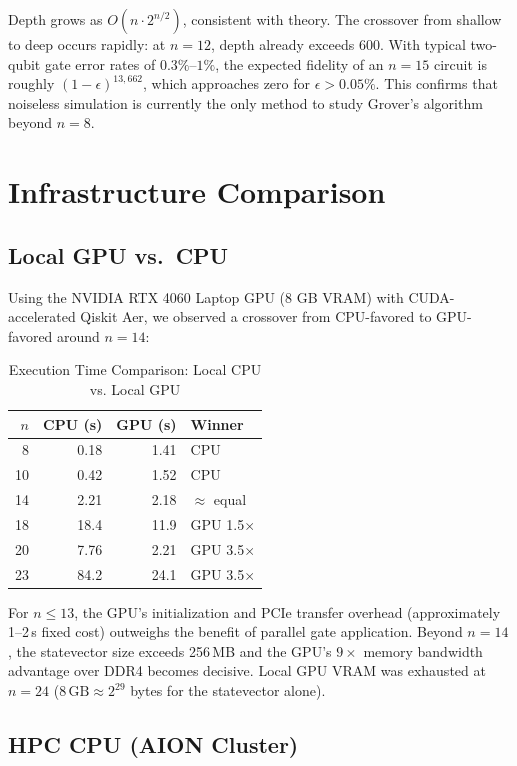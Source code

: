 \documentclass[sigconf, authorversion, nonacm]{acmart}
\begin{document}
Depth grows as $O(n \cdot 2^{n/2})$, consistent with theory. The crossover from shallow to deep occurs rapidly: at $n=12$, depth already exceeds 600. With typical two-qubit gate error rates of $0.3\%$--$1\%$, the expected fidelity of an $n=15$ circuit is roughly $(1-\epsilon)^{13{,}662}$, which approaches zero for $\epsilon > 0.05\%$. This confirms that noiseless simulation is currently the only method to study Grover's algorithm beyond $n=8$.

\section{Infrastructure Comparison}

\subsection{Local GPU vs.\ CPU}

Using the NVIDIA RTX 4060 Laptop GPU (8 GB VRAM) with CUDA-accelerated Qiskit Aer, we observed a crossover from CPU-favored to GPU-favored around $n=14$:

\begin{table}[htbp]
\centering
\caption{Execution Time Comparison: Local CPU vs. Local GPU}
\label{tab:local_gpu_cpu}
\begin{tabular}{rrrl}
\toprule
$n$ & CPU (s) & GPU (s) & Winner \\
\midrule
8  & 0.18  & 1.41  & CPU \\
10 & 0.42  & 1.52  & CPU \\
14 & 2.21  & 2.18  & $\approx$ equal \\
18 & 18.4  & 11.9  & GPU 1.5$\times$ \\
20 & 7.76  & 2.21  & GPU 3.5$\times$ \\
23 & 84.2  & 24.1  & GPU 3.5$\times$ \\
\bottomrule
\end{tabular}
\end{table}

For $n \leq 13$, the GPU's initialization and PCIe transfer overhead (approximately 1--2\,s fixed cost) outweighs the benefit of parallel gate application. Beyond $n=14$, the statevector size exceeds 256\,MB and the GPU's $9\times$ memory bandwidth advantage over DDR4 becomes decisive. Local GPU VRAM was exhausted at $n=24$ ($8\,\text{GB} \approx 2^{29}$ bytes for the statevector alone).

\subsection{HPC CPU (AION Cluster)}
\end{document}
